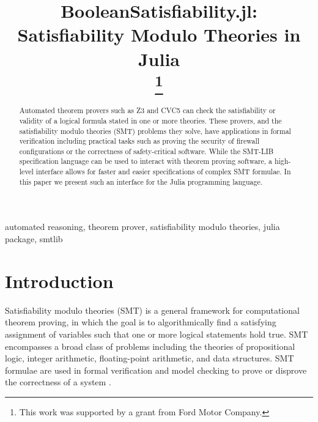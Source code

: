 \documentclass[conference]{IEEEtran}
\begin{document}
\title{BooleanSatisfiability.jl: Satisfiability Modulo Theories in Julia\\
\thanks{This work was supported by a grant from Ford Motor Company.} %
}

\author{
\and
{}
\and
{}
}

\maketitle

\begin{abstract}
Automated theorem provers such as Z3 and CVC5 can check the satisfiability or validity of a logical formula stated in one or more theories. These provers, and the satisfiability modulo theories (SMT) problems they solve, have applications in formal verification including practical tasks such as proving the security of firewall configurations or the correctness of safety-critical software. While the SMT-LIB specification language can be used to interact with theorem proving software, a high-level interface allows for faster and easier specifications of complex SMT formulae. In this paper we present such an interface for the Julia programming language.
\end{abstract}

\begin{IEEEkeywords}
automated reasoning, theorem prover, satisfiability modulo theories, julia package, smtlib
\end{IEEEkeywords}

\section{Introduction}
Satisfiability modulo theories (SMT) is a general framework for computational theorem proving, in which the goal is to algorithmically find a satisfying assignment of variables such that one or more logical statements hold true. SMT encompasses a broad class of problems including the theories of propositional logic, integer arithmetic, floating-point arithmetic, and data structures. SMT formulae are used in formal verification and model checking to prove or disprove the correctness of a system \cite{de2011satisfiabilityintro}.
\end{document}

